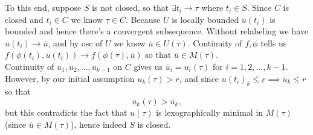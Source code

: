 \documentclass{article}
\newenvironment{ex}[1]
  {\renewcommand\theexercise{#1}\exercise}
  {\endexercise}
\newcommand{\clo}[1]{\overline{#1}}
\begin{document}
\begin{ex}{5.3}
  To this end, suppose $S$ is not closed, so that $\exists t_i \to \tau$ where $t_i \in S$. Since $C$ is closed and $t_i \in C$ we know $\tau \in C$. Because $U$ is locally bounded $u(t_i)$ is bounded and hence there's a convergent subsequence. Without relabeling we have $u(t_i) \to \clo{u}$, and by osc of $U$ we know $\clo{u} \in U(\tau)$. Continuity of $f, \phi$ tells us $f(\phi(t_i), u(t_i)) \to f(\phi(\tau), \clo{u})$ so that $\clo{u} \in M(\tau)$. \, \\

  Continuity of $u_1, u_2, ..., u_{k-1}$ on $C$ gives us $\clo{u}_i = u_i(\tau)$ for $i = 1, 2, ..., k-1$. However, by our initial assumption $u_k(\tau) > r$, and since $u(t_i)_k \le r \implies \clo{u}_k \le r$ so that
  $$
  u_k(\tau) > \clo{u}_k,
  $$
  but this contradicts the fact that $u(\tau)$ is lexographically minimal in $M(\tau)$ (since $\clo{u} \in M(\tau)$), hence indeed $S$ is closed.
\end{ex} %
\end{document}
